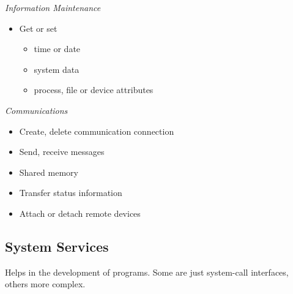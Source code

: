 \documentclass[]{article}
\begin{document}
\emph{Information Maintenance}
\begin{itemize}
    \item Get or set 
    \begin{itemize}
        \item time or date
        \item system data
        \item process, file or device attributes
    \end{itemize}
\end{itemize}

\emph{Communications}
\begin{itemize}
    \item Create, delete communication connection
    \item Send, receive messages
    \item Shared memory
    \item Transfer status information
    \item Attach or detach remote devices
\end{itemize}
\pagebreak

\subsection{System Services}

Helps in the development of programs. Some are just system-call interfaces, others more complex.
\end{document}
